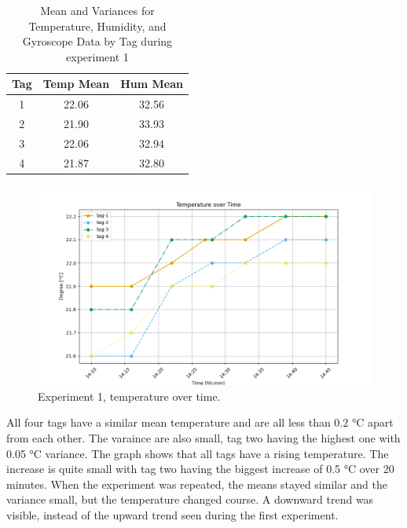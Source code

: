 \begin{table}[h!]
    \centering
    \begin{tabular}{|c|c|c|}
        \hline
        \textbf{Tag} & \textbf{Temp Mean} & \textbf{Hum Mean} \\
        \hline
        1 & 22.06 & 32.56 \\
        2 & 21.90 & 33.93 \\
        3 & 22.06 & 32.94 \\
        4 & 21.87 & 32.80 \\
        \hline
    \end{tabular}
    \caption{Mean and Variances for Temperature, Humidity, and Gyroscope Data by Tag during experiment 1}
    \label{t:exp1_means}
\end{table}

\begin{figure}[ht!]
\includegraphics[width=\linewidth]{graphics/exp/exp1_temp_plot_0.png}
 \caption{Experiment 1, temperature over time.}
\label{f:exp1_graphs_temp}
\end{figure}


All four tags have a similar mean temperature and are all less than 0.2 °C apart from each other.
The varaince are also small, tag two having the highest one with 0.05 °C variance. 
The graph shows that all tags have a rising temperature.
The increase is quite small with tag two having the biggest increase of 0.5 °C over 20 minutes.
When the experiment was repeated, the means stayed similar and the variance small, but the temperature changed course.
A downward trend was visible, instead of the upward trend seen during the first experiment.

